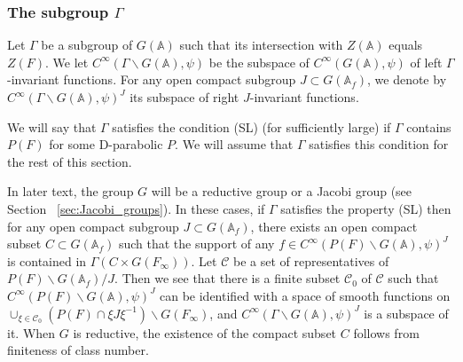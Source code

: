 \documentclass[letterpaper,11pt]{amsart}
\newcommand{\HX}[1]{{\color{red} {#1}}}
\newcommand{\WL}[1]{{\color{purple} {#1}}}
\newcommand{\bA}{\mathbb{A}}
\newcommand{\Z}{\mathbb{Z}}
\newcommand{\cC}{\mathcal{C}}
\newcommand{\bs}{\backslash}
\newcommand{\<}{\negthickspace}
\theoremstyle{definition}
\theoremstyle{plain}
\theoremstyle{remark}
\numberwithin{equation}{section}
\begin{document}
\subsubsection{The subgroup $\Gamma$}
\label{subsubsec:gamma}
Let $\Gamma$ be a subgroup of $G(\bA)$ such that its intersection with $Z(\bA)$ equals $Z(F)$. We let $C^\infty(\Gamma \bs G(\bA), \psi)$ be the subspace of $C^\infty(G(\bA), \psi)$ of left $\Gamma$-invariant functions. For any open compact subgroup $J \subset G(\bA_f)$, we denote by $C^\infty(\Gamma \bs G(\bA), \psi)^J$ its subspace of right $J$-invariant functions.

We will say that $\Gamma$ satisfies the condition (SL) (for sufficiently large) if $\Gamma$ contains $P(F)$ for some D-parabolic $P$. We will assume that $\Gamma$ satisfies this condition for the rest of this section.

In later text, the group $G$ will be a reductive group or a Jacobi group (see Section ~\ref{sec:Jacobi_groups}). In these cases, if $\Gamma$ satisfies the property (SL) then for any open compact subgroup
$J \subset G(\bA_f)$, there exists an open compact subset $C \subset G(\bA_f)$ such
that the support of any $f \in C^\infty(P(F) \bs G(\bA), \psi)^J$ is contained in
$\Gamma (C \times G(F_\infty))$. Let $\cC$ be a set of representatives of $P(F)\bs G(\bA_f)/J$.
Then we see that there is a finite subset $\cC_0$ of $\cC$ such that $C^\infty(P(F) \bs G(\bA), \psi)^J$ can be identified with a space of smooth functions on $\cup_{\xi \in \cC_0}(P(F) \cap \xi J \xi^{-1}) \bs G(F_{\infty})$, and $C^\infty(\Gamma \bs G(\bA), \psi)^J$ is a subspace of it. When $G$ is reductive, the existence of the compact subset $C$ follows from finiteness of class number.
\end{document}
